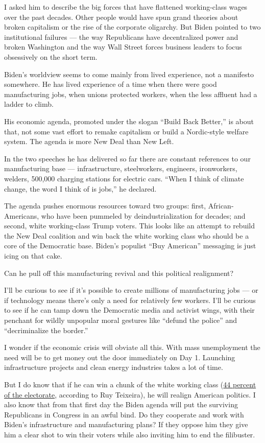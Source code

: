I asked him to describe the big forces that have flattened working-class
wages over the past decades. Other people would have spun grand theories
about broken capitalism or the rise of the corporate oligarchy. But
Biden pointed to two institutional failures --- the way Republicans have
decentralized power and broken Washington and the way Wall Street forces
business leaders to focus obsessively on the short term.

Biden's worldview seems to come mainly from lived experience, not a
manifesto somewhere. He has lived experience of a time when there were
good manufacturing jobs, when unions protected workers, when the less
affluent had a ladder to climb.

His economic agenda, promoted under the slogan ``Build Back Better,'' is
about that, not some vast effort to remake capitalism or build a
Nordic-style welfare system. The agenda is more New Deal than New Left.

In the two speeches he has delivered so far there are constant
references to our manufacturing base --- infrastructure, steelworkers,
engineers, ironworkers, welders, 500,000 charging stations for electric
cars. ``When I think of climate change, the word I think of is jobs,''
he declared.

The agenda pushes enormous resources toward two groups: first,
African-Americans, who have been pummeled by deindustrialization for
decades; and second, white working-class Trump voters. This looks like
an attempt to rebuild the New Deal coalition and win back the white
working class who should be a core of the Democratic base. Biden's
populist ``Buy American'' messaging is just icing on that cake.

Can he pull off this manufacturing revival and this political
realignment?

I'll be curious to see if it's possible to create millions of
manufacturing jobs --- or if technology means there's only a need for
relatively few workers. I'll be curious to see if he can tamp down the
Democratic media and activist wings, with their penchant for wildly
unpopular moral gestures like ``defund the police'' and ``decriminalize
the border.''

I wonder if the economic crisis will obviate all this. With mass
unemployment the need will be to get money out the door immediately on
Day 1. Launching infrastructure projects and clean energy industries
takes a lot of time.

But I do know that if he can win a chunk of the white working class
(\href{https://www.persuasion.community/p/demography-is-not-destiny?utm_medium=email\&utm_campaign=cta}{44
percent of the electorate}, according to Ruy Teixeira), he will realign
American politics. I also know that from that first day the Biden agenda
will put the surviving Republicans in Congress in an awful bind. Do they
cooperate and work with Biden's infrastructure and manufacturing plans?
If they oppose him they give him a clear shot to win their voters while
also inviting him to end the filibuster.

